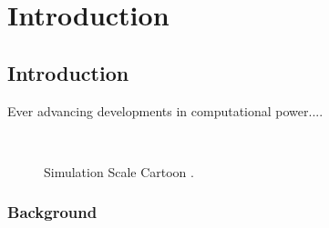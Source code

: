 \chapter{Introduction}

\ifpdf
    \graphicspath{{Chapter1/Chapter1Figs/PNG/}{Chapter1/Chapter1/PDF/}{Chapter1/Chapter1Figs/}}
\else
    \graphicspath{{Chapter1/Chapter1Figs/EPS/}{Chapter1/Chapter1/}}
\fi

\section{Introduction}

Ever advancing developments in computational power....

\begin{figure}[htbp]
\begin{center}
  \mbox{
       }
   \caption{Simulation Scale Cartoon \citep{nielsen2004cgm}.}
   \label{fig:Simscale}
\end{center}
\end{figure}

\subsection{Background}





